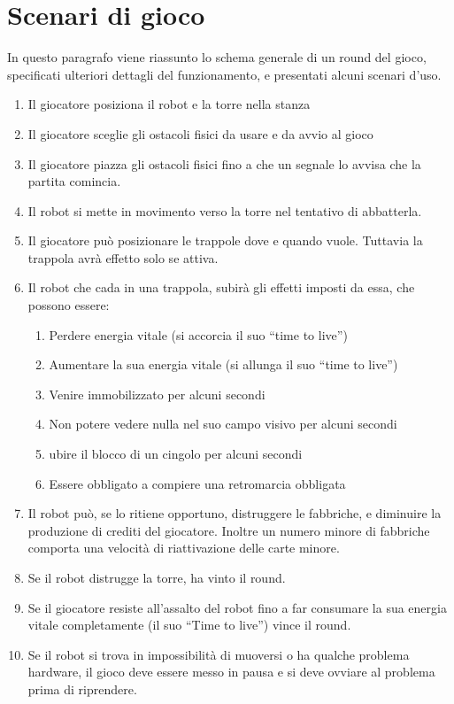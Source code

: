 \section{Scenari di gioco}
In questo paragrafo viene riassunto lo schema generale di un round del gioco, specificati ulteriori dettagli del funzionamento, e presentati alcuni scenari d'uso.
\begin{enumerate}
    \item Il giocatore posiziona il robot e la torre nella stanza
	\item Il giocatore sceglie gli ostacoli fisici da usare e da avvio al gioco
	\item Il giocatore piazza gli ostacoli fisici fino a che un segnale lo avvisa che la partita comincia.
	\item Il robot si mette in movimento verso la torre nel tentativo di abbatterla.
	\item Il giocatore può posizionare le trappole dove e quando vuole. Tuttavia la trappola avrà effetto solo se attiva.
	\item Il robot che cada in una trappola, subirà gli effetti imposti da essa, che possono essere:
		\begin{enumerate}
		\item Perdere energia vitale (si accorcia il suo ``time to live'')
		\item Aumentare la sua energia vitale (si allunga il suo ``time to live'')
		\item Venire immobilizzato per alcuni secondi
		\item Non potere vedere nulla nel suo campo visivo per alcuni secondi
		\item ubire il blocco di un cingolo per alcuni secondi
		\item Essere obbligato a compiere una retromarcia obbligata
		\end{enumerate}
	\item Il robot può, se lo ritiene opportuno, distruggere le fabbriche, e diminuire la produzione di crediti del giocatore. Inoltre un numero minore di fabbriche comporta una  velocità di riattivazione delle carte minore.
	\item Se il robot distrugge la torre, ha vinto il round.
	\item Se il giocatore resiste all'assalto del robot fino a far consumare la sua energia vitale completamente (il suo ``Time to live'') vince il round.
	\item Se il robot si trova in impossibilità di muoversi o ha qualche problema hardware, il gioco deve essere messo in pausa e si deve ovviare al problema prima di riprendere.
	\end{enumerate}

